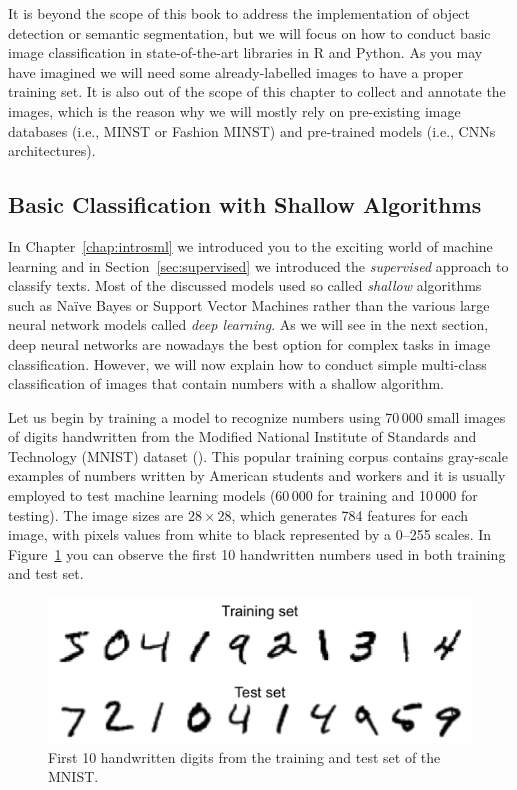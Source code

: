 It is beyond the scope of this book to address the implementation of object detection or semantic segmentation, but we will focus on how to conduct basic image classification in state-of-the-art libraries in R and Python. As you may have imagined we will need some already-labelled images to have a proper training set. It is also out of the scope of this chapter to collect and annotate the images, which is the reason why we will mostly rely on pre-existing image databases (i.e., MINST or Fashion MINST) and pre-trained models (i.e., CNNs architectures).

\subsection{Basic Classification with Shallow Algorithms}\label{subsec:shallow}

In Chapter~\ref{chap:introsml} we introduced you to the exciting world of machine learning and in Section~\ref{sec:supervised}  we introduced the \textit{supervised} approach to classify texts. Most of the discussed models used so called \textit{shallow} algorithms such as Na\"ive Bayes or Support Vector Machines rather than the various large neural network models called \emph{deep learning}. As we will see in the next section, deep neural networks are nowadays the best option for complex tasks in image classification. However, we will now explain how to conduct simple multi-class classification of images that contain numbers with a shallow algorithm.

Let us begin by training a model to recognize numbers using 70\,000 small images of digits handwritten from the Modified National Institute of Standards and Technology (MNIST) dataset  (\cite{lecun1998gradient}). This popular training corpus contains gray-scale examples of numbers written by American students and workers and it is usually employed to test machine learning models (60\,000 for training and 10\,000 for testing). The image sizes are $28 \times 28$, which generates 784 features for each image, with pixels values from white to black represented by a 0--255 scales. In Figure~\ref{fig:numbers} you can observe the first 10 handwritten numbers used in both training and test set.

\begin{figure}
\centering
\includegraphics[width=0.9\linewidth]{figures/ch15_numbers.png}
\caption{First 10 handwritten digits from the training and test set of the MNIST.}
\label{fig:numbers}
\end{figure}

